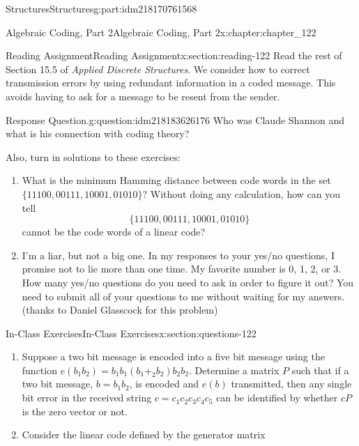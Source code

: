 \documentclass[oneside,10pt,]{book}
\numberwithin{equation}{section}
\begin{document}
\begin{partptx}{Structures}{}{Structures}{}{}{g:part:idm218170761568}
\begin{chapterptx}{Algebraic Coding, Part 2}{}{Algebraic Coding, Part 2}{}{}{x:chapter:chapter_122}
\typeout{************************************************}
%
\begin{sectionptx}{Reading Assignment}{}{Reading Assignment}{}{}{x:section:reading-122}
Read the rest of  Section 15.5 of \emph{Applied Discrete Structures}.  We consider how to correct transmission errors by using redundant information in a coded message.  This avoids having to ask for a message to be resent from the sender.%
\begin{question}{Response Question.}{g:question:idm218183626176}%
Who was Claude Shannon and what is his connection with coding theory?%
\end{question}
Also, turn in solutions to these exercises:%
\begin{enumerate}[label=\arabic*.]
\item{}What is the minimum Hamming distance between code words in the set \(\{11100,00111,10001,01010\}\)? Without doing any calculation, how can you tell%
\begin{equation*}
\{11100,00111,10001,01010\}
\end{equation*}
cannot be the code words of a linear code?%
\item{}I'm a liar, but not a big one.  In my responses to your yes\slash{}no questions, I promise not to lie more than one time. My favorite number is 0, 1, 2, or 3.  How many yes\slash{}no questions do you need to ask in order to figure it out? You need to submit all of your questions to me without waiting for my answers. (thanks to Daniel Glasscock for this problem)%
\end{enumerate}
%
\end{sectionptx}
%
%
\typeout{************************************************}
\typeout{************************************************}
%
\begin{sectionptx}{In-Class Exercises}{}{In-Class Exercises}{}{}{x:section:questions-122}
%
\begin{enumerate}[label=\arabic*.]
\item{}Suppose a two bit message is encoded into a five bit message using the function \(e(b_{1}b_{2})=b_{1}b_{1}(b_{1}+_2 b_{2})b_{2}b_{2}\).  Determine a matrix \(P\) such that if a two bit message, \(b = b_{1}b_{2}\), is encoded and \(e(b)\) transmitted, then any single bit error in the received string \(c=c_{1}c_{2}c_{3}c_{4}c_{5}\) can be identified by whether \(c P\) is the zero vector or not.%
\item{}Consider the  linear code defined by the generator matrix%

\end{enumerate}
\end{sectionptx}
\end{chapterptx}
\end{partptx}
\end{document}
